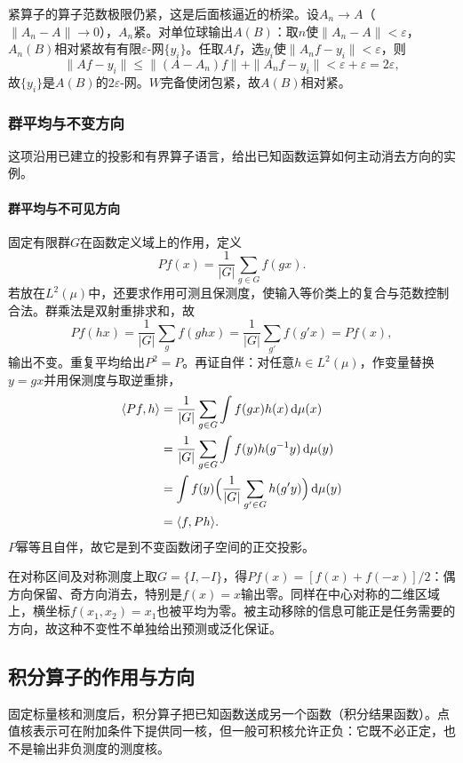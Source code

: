紧算子的算子范数极限仍紧，这是后面核逼近的桥梁。设$A_n\to A$（$\|A_n-A\|\to0$），$A_n$紧。对单位球输出$A(B)$：取$n$使$\|A_n-A\|<\varepsilon$，$A_n(B)$相对紧故有有限$\varepsilon$-网$\{y_i\}$。任取$Af$，选$y_i$使$\|A_nf-y_i\|<\varepsilon$，则
\[
\|Af-y_i\|\le\|(A-A_n)f\|+\|A_nf-y_i\|<\varepsilon+\varepsilon=2\varepsilon,
\]
故$\{y_i\}$是$A(B)$的$2\varepsilon$-网。$W$完备使闭包紧，故$A(B)$相对紧。

\subsubsection{群平均与不变方向}
\label{subsubsec:group-average}

这项沿用已建立的投影和有界算子语言，给出已知函数运算如何主动消去方向的实例。

\paragraph{群平均与不可见方向}

固定有限群$G$在函数定义域上的作用，定义
\[
Pf(x)=\frac1{|G|}\sum_{g\in G}f(gx).
\]
若放在$L^2(\mu)$中，还要求作用可测且保测度，使输入等价类上的复合与范数控制合法。群乘法是双射重排求和，故
\[
P f(hx)=\frac1{|G|}\sum_g f(ghx)=\frac1{|G|}\sum_{g'}f(g'x)=Pf(x),
\]
输出不变。重复平均给出$P^2=P$。再证自伴：对任意$h\in L^2(\mu)$，作变量替换$y=gx$并用保测度与取逆重排，
\[
\begin{aligned}
\langle Pf,h\rangle
&=\frac1{|G|}\sum_{g\in G}\int f(gx)h(x)\,\mathrm d\mu(x)\\
&=\frac1{|G|}\sum_{g\in G}\int f(y)h(g^{-1}y)\,\mathrm d\mu(y)\\
&=\int f(y)\Bigl(\frac1{|G|}\sum_{g'\in G}h(g'y)\Bigr)\,\mathrm d\mu(y)\\
&=\langle f,Ph\rangle.
\end{aligned}
\]
$P$幂等且自伴，故它是到不变函数闭子空间的正交投影。

在对称区间及对称测度上取$G=\{I,-I\}$，得$Pf(x)=[f(x)+f(-x)]/2$：偶方向保留、奇方向消去，特别是$f(x)=x$输出零。同样在中心对称的二维区域上，横坐标$f(x_1,x_2)=x_1$也被平均为零。被主动移除的信息可能正是任务需要的方向，故这种不变性不单独给出预测或泛化保证。

\subsection{积分算子的作用与方向}
\label{subsubsec:integral-operator-directions}

固定标量核和测度后，积分算子把已知函数送成另一个函数（积分结果函数）。点值核表示可在附加条件下提供同一核，但一般可积核允许正负：它既不必正定，也不是输出非负测度的测度核。

